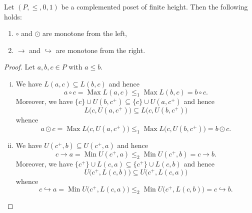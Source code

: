 \documentclass[10pt,a4paper]{amsart}
\DeclareMathOperator{\Max}{Max}
\DeclareMathOperator{\Min}{Min}
\begin{document}
\begin{lemma}
Let $(P,\le,0,1)$ be a complemented poset of finite height. Then the following holds:
\begin{enumerate}[{\rm(i)}]
\item $\circ$ and $\odot$ are monotone from the left,
\item $\to$ and $\hookrightarrow$ are monotone from the right.
\end{enumerate}	
\end{lemma}

\begin{proof}
Let $a,b,c\in P$ with $a\le b$.
\begin{enumerate}[(i)]
\item We have $L(a,c)\subseteq L(b,c)$ and hence
\[
a\circ c=\Max L(a,c)\le_1\Max L(b,c)=b\circ c.
\]
Moreover, we have $\{c\}\cup U(b,c^+)\subseteq\{c\}\cup U(a,c^+)$ and hence
\[
L\big(c,U(a,c^+)\big)\subseteq L\big(c,U(b,c^+)\big)
\]
whence
\[
a\odot c=\Max L\big(c,U(a,c^+)\big)\le_1\Max L\big(c,U(b,c^+)\big)=b\odot c.
\]
\item We have $U(c^+,b)\subseteq U(c^+,a)$ and hence
\[
c\to a=\Min U(c^+,a)\le_2\Min U(c^+,b)=c\to b.
\]
Moreover, we have $\{c^+\}\cup L(c,a)\subseteq\{c^+\}\cup L(c,b)$ and hence
\[
U\big(c^+,L(c,b)\big)\subseteq U\big(c^+,L(c,a)\big)
\]
whence
\[
c\hookrightarrow a=\Min U\big(c^+,L(c,a)\big)\le_2\Min U\big(c^+,L(c,b)\big)=c\hookrightarrow b.
\]
\end{enumerate}	
\end{proof}
\end{document}
